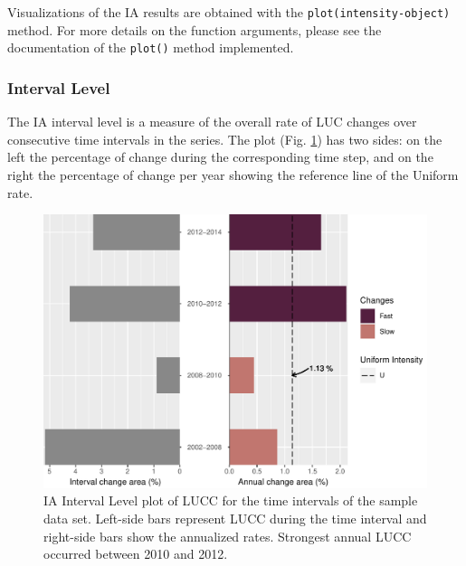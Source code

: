 Visualizations of the IA results are obtained with the
\texttt{plot(intensity-object)} method. For more details on the function
arguments, please see the documentation of the \texttt{plot()} method
implemented.

\hypertarget{interval-level}{%
\subsubsection{Interval Level}\label{interval-level}}

The IA interval level is a measure of the overall rate of LUC changes
over consecutive time intervals in the series. The plot (Fig.
\ref{fig:int_level}) has two sides: on the left the percentage of change
during the corresponding time step, and on the right the percentage of
change per year showing the reference line of the Uniform rate.

\begin{Schunk}
\begin{figure}[h]

{\centering \includegraphics[width=0.8\linewidth,]{figures/interval_lvl.pdf} 

}

\caption[IA Interval Level plot]{IA Interval Level plot of LUCC for the time intervals of the sample data set. Left-side bars represent LUCC during the time interval and right-side bars show the annualized rates. Strongest annual LUCC occurred between 2010 and 2012.}\label{fig:int_level}
\end{figure}
\end{Schunk}

